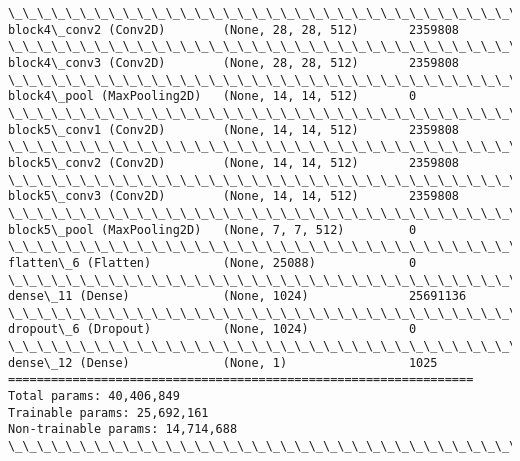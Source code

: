 \documentclass[11pt]{article}
\begin{document}
\begin{Verbatim}[commandchars=\\\{\}]
\_\_\_\_\_\_\_\_\_\_\_\_\_\_\_\_\_\_\_\_\_\_\_\_\_\_\_\_\_\_\_\_\_\_\_\_\_\_\_\_\_\_\_\_\_\_\_\_\_\_\_\_\_\_\_\_\_\_\_\_\_\_\_\_\_
block4\_conv2 (Conv2D)        (None, 28, 28, 512)       2359808   
\_\_\_\_\_\_\_\_\_\_\_\_\_\_\_\_\_\_\_\_\_\_\_\_\_\_\_\_\_\_\_\_\_\_\_\_\_\_\_\_\_\_\_\_\_\_\_\_\_\_\_\_\_\_\_\_\_\_\_\_\_\_\_\_\_
block4\_conv3 (Conv2D)        (None, 28, 28, 512)       2359808   
\_\_\_\_\_\_\_\_\_\_\_\_\_\_\_\_\_\_\_\_\_\_\_\_\_\_\_\_\_\_\_\_\_\_\_\_\_\_\_\_\_\_\_\_\_\_\_\_\_\_\_\_\_\_\_\_\_\_\_\_\_\_\_\_\_
block4\_pool (MaxPooling2D)   (None, 14, 14, 512)       0         
\_\_\_\_\_\_\_\_\_\_\_\_\_\_\_\_\_\_\_\_\_\_\_\_\_\_\_\_\_\_\_\_\_\_\_\_\_\_\_\_\_\_\_\_\_\_\_\_\_\_\_\_\_\_\_\_\_\_\_\_\_\_\_\_\_
block5\_conv1 (Conv2D)        (None, 14, 14, 512)       2359808   
\_\_\_\_\_\_\_\_\_\_\_\_\_\_\_\_\_\_\_\_\_\_\_\_\_\_\_\_\_\_\_\_\_\_\_\_\_\_\_\_\_\_\_\_\_\_\_\_\_\_\_\_\_\_\_\_\_\_\_\_\_\_\_\_\_
block5\_conv2 (Conv2D)        (None, 14, 14, 512)       2359808   
\_\_\_\_\_\_\_\_\_\_\_\_\_\_\_\_\_\_\_\_\_\_\_\_\_\_\_\_\_\_\_\_\_\_\_\_\_\_\_\_\_\_\_\_\_\_\_\_\_\_\_\_\_\_\_\_\_\_\_\_\_\_\_\_\_
block5\_conv3 (Conv2D)        (None, 14, 14, 512)       2359808   
\_\_\_\_\_\_\_\_\_\_\_\_\_\_\_\_\_\_\_\_\_\_\_\_\_\_\_\_\_\_\_\_\_\_\_\_\_\_\_\_\_\_\_\_\_\_\_\_\_\_\_\_\_\_\_\_\_\_\_\_\_\_\_\_\_
block5\_pool (MaxPooling2D)   (None, 7, 7, 512)         0         
\_\_\_\_\_\_\_\_\_\_\_\_\_\_\_\_\_\_\_\_\_\_\_\_\_\_\_\_\_\_\_\_\_\_\_\_\_\_\_\_\_\_\_\_\_\_\_\_\_\_\_\_\_\_\_\_\_\_\_\_\_\_\_\_\_
flatten\_6 (Flatten)          (None, 25088)             0         
\_\_\_\_\_\_\_\_\_\_\_\_\_\_\_\_\_\_\_\_\_\_\_\_\_\_\_\_\_\_\_\_\_\_\_\_\_\_\_\_\_\_\_\_\_\_\_\_\_\_\_\_\_\_\_\_\_\_\_\_\_\_\_\_\_
dense\_11 (Dense)             (None, 1024)              25691136  
\_\_\_\_\_\_\_\_\_\_\_\_\_\_\_\_\_\_\_\_\_\_\_\_\_\_\_\_\_\_\_\_\_\_\_\_\_\_\_\_\_\_\_\_\_\_\_\_\_\_\_\_\_\_\_\_\_\_\_\_\_\_\_\_\_
dropout\_6 (Dropout)          (None, 1024)              0         
\_\_\_\_\_\_\_\_\_\_\_\_\_\_\_\_\_\_\_\_\_\_\_\_\_\_\_\_\_\_\_\_\_\_\_\_\_\_\_\_\_\_\_\_\_\_\_\_\_\_\_\_\_\_\_\_\_\_\_\_\_\_\_\_\_
dense\_12 (Dense)             (None, 1)                 1025      
=================================================================
Total params: 40,406,849
Trainable params: 25,692,161
Non-trainable params: 14,714,688
\_\_\_\_\_\_\_\_\_\_\_\_\_\_\_\_\_\_\_\_\_\_\_\_\_\_\_\_\_\_\_\_\_\_\_\_\_\_\_\_\_\_\_\_\_\_\_\_\_\_\_\_\_\_\_\_\_\_\_\_\_\_\_\_\_

    \end{Verbatim}
\end{document}
